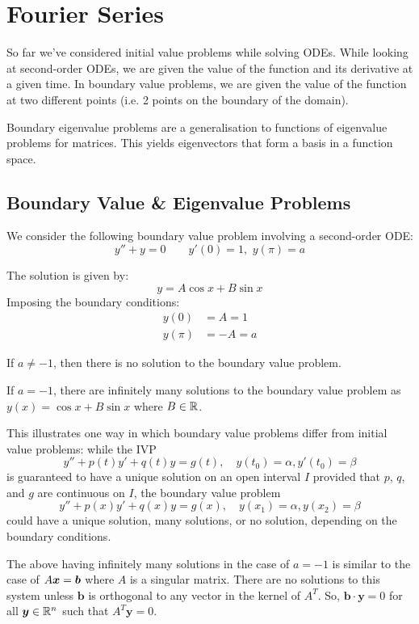 \section{Fourier Series}

So far we've considered initial value problems while solving ODEs. While looking at second-order ODEs, we are given the value of the function and its derivative at a given time. In boundary value problems, we are given the value of the function at two different points (i.e. 2 points on the boundary of the domain).

Boundary eigenvalue problems are a generalisation to functions of eigenvalue problems for matrices. This yields eigenvectors that form a basis in a function space. 

\subsection{Boundary Value \& Eigenvalue Problems}\label{sec:boundaryvalprob}

\begin{eg}\label{eg:bvpmotiv}
	We consider the following boundary value problem involving a second-order ODE:
	\[
	y'' + y = 0 \qquad y'(0)=1, \,\, y(\pi) = a
	\]
	
	The solution is given by: 
	\[
	y = A \cos{x} + B \sin{x}
	\]
	Imposing the boundary conditions:
	\begin{align*}
		y(0) &= A = 1 \\
		y(\pi) &= -A = a
	\end{align*}
	
	If $a \neq -1$, then there is no solution to the boundary value problem.
	
	If $a = -1$, there are infinitely many solutions to the boundary value problem as $y(x) = \cos{x} + B\sin{x}$ where $B \in \mathbb{R}$. 
\end{eg}
	
This illustrates one way in which boundary value problems differ from initial value problems: while the IVP
\[
	y'' + p(t)y' + q(t)y = g(t), \quad y(t_0) = \alpha, y'(t_0) = \beta
\]
is guaranteed to have a unique solution on an open interval $I$ provided that $p$, $q$, and $g$ are continuous on $I$, the boundary value problem
\[
	y'' + p(x)y' + q(x)y = g(x), \quad y(x_1) = \alpha, y(x_2) = \beta
\]
could have a unique solution, many solutions, or no solution, depending on the boundary conditions.
	
The above  having infinitely many solutions in the case of $a = -1$ is similar to the case of $A\bm{x} = \bm{b}$ where $A$ is a singular matrix. There are no solutions to this system unless $\bm{b}$ is orthogonal to any vector in the kernel of $A^T$. So, $\bm{b} \cdot \bm{y} = 0$ for all $\bm{y} \in \mathbb{R}^n$ such that $A^T \bm{y} = 0$.

